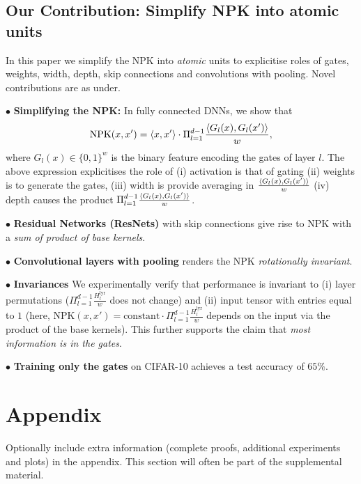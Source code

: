 \documentclass{article}
\begin{document}
\subsection{Our Contribution: Simplify NPK into atomic units}
In this paper we simplify the NPK into \emph{atomic} units to explicitise roles of gates, weights, width, depth, skip connections and convolutions with pooling. Novel contributions  are as under.

$\bullet$ \textbf{Simplifying the NPK:} In fully connected DNNs, we show that 
\begin{align*}
\text{NPK}(x,x')=\langle x,x'\rangle\cdot \Pi_{l=1}^{d-1} \frac{\langle G_l(x),G_l(x')\rangle}w, 
 \end{align*}
 where $G_l(x)\in\{0,1\}^w$ is the binary feature encoding the gates of layer $l$. The above expression explicitises the role of (i) activation is that of gating (ii) weights is to generate the gates, (iii) width is provide averaging in $\frac{\langle G_l(x),G_l(x')\rangle}w$ (iv) depth causes the product $\Pi_{l=1}^{d-1} \frac{\langle G_l(x),G_l(x')\rangle}w$. 
 
$\bullet$ \textbf{Residual Networks (ResNets)} with skip connections give rise to NPK with a \emph{ sum of product of base kernels}.

$\bullet$ \textbf{Convolutional layers with pooling} renders the NPK \emph{rotationally invariant}. 

$\bullet$ \textbf{Invariances} We experimentally verify that performance is invariant to (i) layer permutations ($\Pi_{l=1}^{d-1} \frac{H^{\text{lyr}}_l}{w}$ does not change) and (ii) input tensor with entries equal to $1$ (here, NPK$(x,x')= \text{constant}\cdot \Pi_{l=1}^{d-1} \frac{H^{\text{lyr}}_l}{w}$ depends on the input via the product of the base kernels). This further supports the claim that \emph{most information is in the gates}. 

$\bullet$ \textbf{Training only the gates} on CIFAR-10 achieves a test accuracy of $65\%$.









\appendix

\section{Appendix}

Optionally include extra information (complete proofs, additional experiments and plots) in the appendix.
This section will often be part of the supplemental material.
\end{document}
